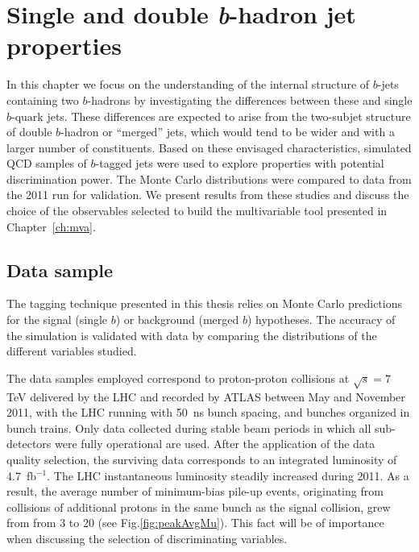 \chapter{Single and double \emph{\textbf{b}}-hadron jet properties}\label{ch:kinematic}

In this chapter we focus on the understanding of the internal structure of $b$-jets containing two $b$-hadrons by investigating the differences between these and single $b$-quark jets.  These differences %
are expected to arise from the two-subjet structure of double $b$-hadron or ``merged'' jets, which would tend to be wider and with a larger number of constituents. 
Based on these envisaged characteristics, simulated QCD samples of $b$-tagged jets were used to explore properties with potential discrimination power.  The Monte Carlo distributions were  compared to data from the 2011 run for validation.
We present results from these studies and discuss the choice of the observables selected to build the multivariable tool presented in Chapter~\ref{ch:mva}.


\section{Data sample}\label{sec:dataanalysis}


The tagging technique presented in this thesis relies on Monte Carlo predictions for the signal (single $b$) or background (merged $b$) hypotheses. The accuracy of the simulation is validated with data by comparing the distributions of the different variables studied.

The data samples employed correspond to proton-proton collisions at $\sqrt{s}=7$ TeV delivered by the LHC and recorded by ATLAS between May and November 2011, with the LHC running with 50~ns bunch spacing, and bunches organized in bunch trains. Only data collected during stable beam periods in which all sub-detectors were fully operational are used. After the application of the data quality selection, the  surviving data corresponds to an integrated luminosity of 4.7~fb$^{-1}$. The LHC instantaneous luminosity steadily increased during 2011. As a result, the average number of minimum-bias pile-up events, originating from collisions of additional protons in the same bunch as the signal collision, grew from from 3 to 20 (see Fig.\ref{fig:peakAvgMu}). This fact will be of importance when discussing the selection of discriminating variables.  

